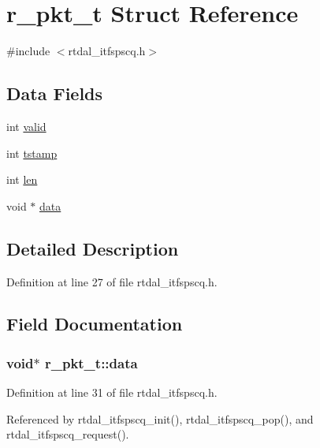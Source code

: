 \hypertarget{structr__pkt__t}{\section{r\-\_\-pkt\-\_\-t Struct Reference}
\label{structr__pkt__t}
}


{\ttfamily \#include $<$rtdal\-\_\-itfspscq.\-h$>$}

\subsection*{Data Fields}
\begin{DoxyCompactItemize}
\item 
int \hyperlink{structr__pkt__t_a22af5ea9cd0dc91928651e046400dc51}{valid}
\item 
int \hyperlink{structr__pkt__t_a0d4ff9e1354844e0d83eb14ebad1b309}{tstamp}
\item 
int \hyperlink{structr__pkt__t_a9c23f94deac4bfb5f8584afcdd107f8a}{len}
\item 
void $\ast$ \hyperlink{structr__pkt__t_a031b8fabbf383a6ab7ddef2b424918a7}{data}
\end{DoxyCompactItemize}


\subsection{Detailed Description}


Definition at line 27 of file rtdal\-\_\-itfspscq.\-h.



\subsection{Field Documentation}
\hypertarget{structr__pkt__t_a031b8fabbf383a6ab7ddef2b424918a7}{
\subsubsection[{data}]{\setlength{\rightskip}{0pt plus 5cm}void$\ast$ r\-\_\-pkt\-\_\-t\-::data}}\label{structr__pkt__t_a031b8fabbf383a6ab7ddef2b424918a7}


Definition at line 31 of file rtdal\-\_\-itfspscq.\-h.



Referenced by rtdal\-\_\-itfspscq\-\_\-init(), rtdal\-\_\-itfspscq\-\_\-pop(), and rtdal\-\_\-itfspscq\-\_\-request().

